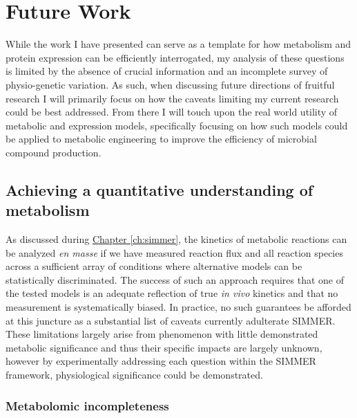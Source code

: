 \section{Future Work}

While the work I have presented can serve as a template for how metabolism and protein expression can be efficiently interrogated, my analysis of these questions is limited by the absence of crucial information and an incomplete survey of physio-genetic variation. As such, when discussing future directions of fruitful research I will primarily focus on how the caveats limiting my current research could be best addressed. From there I will touch upon the real world utility of metabolic and expression models, specifically focusing on how such models could be applied to metabolic engineering to improve the efficiency of microbial compound production.

\subsection{Achieving a quantitative understanding of metabolism}

As discussed during \hyperref[ch:simmer]{Chapter \ref{ch:simmer}}, the kinetics of metabolic reactions can be analyzed \textit{en masse} if we have measured reaction flux and all reaction species across a sufficient array of conditions where alternative models can be statistically discriminated. The success of such an approach requires that one of the tested models is an adequate reflection of true \textit{in vivo} kinetics and that no measurement is systematically biased. In practice, no such guarantees be afforded at this juncture as a substantial list of caveats currently adulterate SIMMER. These limitations largely arise from phenomenon with little demonstrated metabolic significance and thus their specific impacts are largely unknown, however by experimentally addressing each question within the SIMMER framework, physiological significance could be demonstrated.

\subsubsection{Metabolomic incompleteness}


